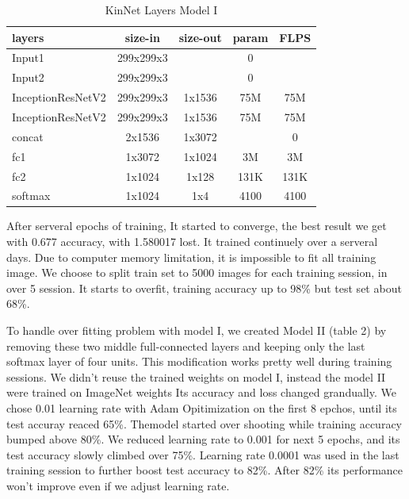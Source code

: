\documentclass{article}
\begin{document}
\begin{table}[h]
	\centering
	\begin{tabular}{ | l | c | c | c | c |}
		\hline
		\textbf{layers}&\textbf{size-in}&\textbf{size-out}&\textbf{param}&\textbf{FLPS}\\
		\hline
			Input1 & 299x299x3 & & 0 & \\
			Input2 & 299x299x3 & & 0 & \\
			InceptionResNetV2 & 299x299x3 & 1x1536 & 75M & 75M \\
			InceptionResNetV2 & 299x299x3 & 1x1536 & 75M & 75M \\
			concat & 2x1536 & 1x3072 & & 0 \\
			fc1 & 1x3072 & 1x1024 & 3M & 3M \\
			fc2 & 1x1024 & 1x128 & 131K & 131K \\
			softmax & 1x1024 & 1x4 & 4100 & 4100 \\
		\hline
	\end{tabular}
	\caption{KinNet Layers Model I}
	\label{table:2}
\end{table}

After serveral epochs of training, It started to converge, the best result we
get with 0.677 accuracy, with 1.580017 lost. It trained continuely over a
serveral days. Due to computer memory limitation, it is impossible to fit all
training image. We choose to split train set to 5000 images for each training
session, in over 5 session. It starts to overfit, training accuracy up to 98\%
but test set about 68\%.

To handle over fitting problem with model I, we created Model II (table 2) by
removing these two middle full-connected layers and keeping only the last
softmax layer of four units. This modification works pretty well during
training sessions.  We didn't reuse the trained weights on model I, instead the
model II were trained on ImageNet weights Its accuracy and loss changed
grandually. We chose 0.01 learning rate with Adam Opitimization on the first 8
epchos, until its test accuray reaced 65\%. Themodel started over shooting
while training accuracy bumped above 80\%.  We reduced learning rate to 0.001
for next 5 epochs, and its test accuracy slowly climbed over 75\%. Learning
rate 0.0001 was used in the last training session to further boost test
accuracy to 82\%. After 82\% its performance won't improve even if we adjust
learning rate.
\end{document}
